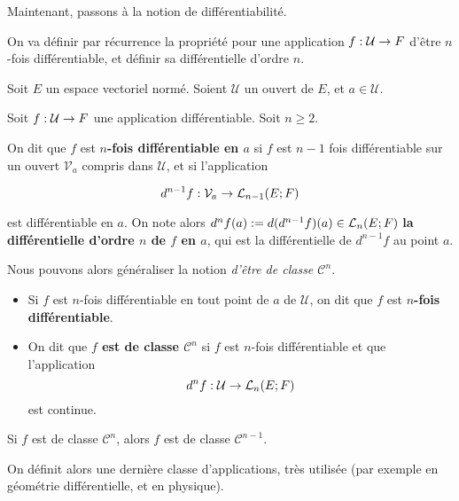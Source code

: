Maintenant, passons à la notion de différentiabilité.

On va définir par récurrence la propriété pour une application
$\GSfunction{f}{\mathcal{U}}{F}$ d'être $n$-fois différentiable, et définir
sa différentielle d'ordre $n$.

\begin{definition}
	Soit $E$ un espace vectoriel normé. Soient $\mathcal{U}$ un ouvert de $E$,
	et $a \in \mathcal{U}$.

	Soit $\GSfunction{f}{\mathcal{U}}{F}$ une application différentiable.
	Soit $n \geq 2$.

	On dit que $f$ est \textbf{$n$-fois différentiable en $a$} si $f$ est $n - 1$ fois
	différentiable sur un ouvert $\mathcal{V}_{a}$ compris dans $\mathcal{U}$,
	et si l'application

	\begin{equation*}
		d^{n - 1} f : \mathcal{V}_{a} \rightarrow \GScontinueHomo[n -1]{E}{F}
	\end{equation*}

	est différentiable en $a$.
	On note alors $d^{n} f (a) := d (d^{n - 1}f) (a) \in
	\GScontinueHomo[n]{E}{F}$ \textbf{la
	différentielle d'ordre $n$ de $f$ en $a$}, qui est la différentielle de
	$d^{n - 1} f$ au point $a$.
\end{definition}

Nous pouvons alors généraliser la notion \textit{d'être de classe
	$\mathcal{C}^{n}$}.

\begin{definition}
	\begin{itemize}
		\item Si $f$ est $n$-fois différentiable en tout point de $a$ de
			$\mathcal{U}$, on dit que $f$ est \textbf{$n$-fois différentiable}.
		\item On dit que \textbf{$f$ est de classe $\mathcal{C}^{n}$} si $f$ est
			$n$-fois différentiable et que l'application
			\begin{equation*}
				d^{n} f : \mathcal{U} \rightarrow \GScontinueHomo[n]{E}{F}
			\end{equation*}
			est continue.
	\end{itemize}
\end{definition}

\begin{remarque}
	Si $f$ est de classe $\mathcal{C}^{n}$, alors $f$ est de classe
	$\mathcal{C}^{n - 1}$.
\end{remarque}

On définit alors une dernière classe d'applications, très utilisée (par exemple
en géométrie différentielle, et en physique).

